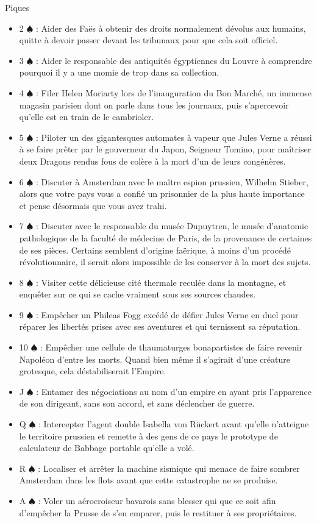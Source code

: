 \documentclass[a5paper,pagesize,french]{book}
\begin{document}
Piques
\begin{itemize}
	\item[] 2{ $\spadesuit$ } : Aider des Faës à obtenir des droits normalement dévolus aux humains, quitte à devoir passer devant les tribunaux pour que cela soit officiel.
	\item[] 3{ $\spadesuit$ } : Aider le responsable des antiquités égyptiennes du Louvre à comprendre pourquoi il y a une momie de trop dans sa collection.
	\item[] 4{ $\spadesuit$ } : Filer Helen Moriarty lors de l'inauguration du Bon Marché, un immense magasin parisien dont on parle dans tous les journaux, puis s'apercevoir qu'elle est en train de le cambrioler.
	\item[] 5{ $\spadesuit$ } : Piloter un des gigantesques automates à vapeur que Jules Verne a réussi à se faire prêter par le gouverneur du Japon, Seigneur Tomino, pour maîtriser deux Dragons rendus fous de colère à la mort d'un de leurs congénères.
	\item[] 6{ $\spadesuit$ } : Discuter à Amsterdam avec le maître espion prussien, Wilhelm Stieber, alors que votre pays vous a confié un prisonnier de la plus haute importance et pense désormais que vous avez trahi.
	\item[] 7{ $\spadesuit$ } : Discuter avec le responsable du musée Dupuytren, le musée d'anatomie pathologique de la faculté de médecine de Paris, de la provenance de certaines de ses pièces. Certains semblent d'origine faërique, à moins d'un procédé révolutionnaire, il serait alors impossible de les conserver à la mort des sujets.
	\item[] 8{ $\spadesuit$ } : Visiter cette délicieuse cité thermale reculée dans la montagne, et enquêter sur ce qui se cache vraiment sous ses sources chaudes.
	\item[] 9{ $\spadesuit$ } : Empêcher un Phileas Fogg excédé de défier Jules Verne en duel pour réparer les libertés prises avec ses aventures et qui ternissent sa réputation.
	\item[] 10{ $\spadesuit$ } : Empêcher une cellule de thaumaturges bonapartistes de faire revenir Napoléon d'entre les morts. Quand bien même il s'agirait d'une créature grotesque, cela déstabiliserait l'Empire.
	\item[] J{ $\spadesuit$ } : Entamer des négociations au nom d'un empire en ayant pris l'apparence de son dirigeant, sans son accord, et sans déclencher de guerre.
	\item[] Q{ $\spadesuit$ } : Intercepter l'agent double Isabella von Rückert avant qu'elle n'atteigne le territoire prussien et remette à des gens de ce pays le prototype de calculateur de Babbage portable qu'elle a volé.
	\item[] R{ $\spadesuit$ } : Localiser et arrêter la machine sismique qui menace de faire sombrer Amsterdam dans les flots avant que cette catastrophe ne se produise.
	\item[] A{ $\spadesuit$ } : Voler un aérocroiseur bavarois sans blesser qui que ce soit afin d'empêcher la Prusse de s'en emparer, puis le restituer à ses propriétaires.
\end{itemize}~\\
\end{document}
